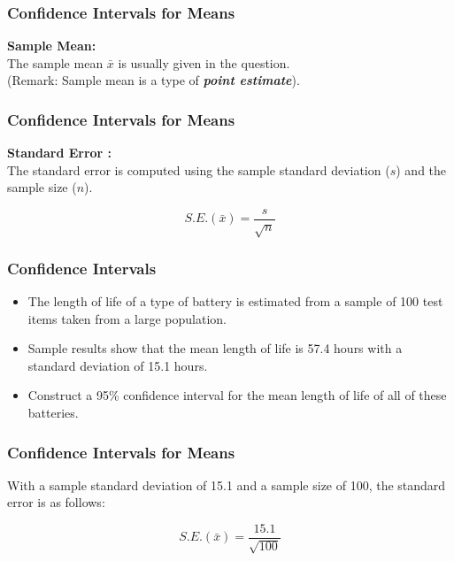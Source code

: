\documentclass{beamer}
\begin{document}
\begin{frame}

\frametitle{Confidence Intervals for Means}
\LARGE
\textbf{Sample Mean:}\\
The sample mean $\bar{x}$ is usually given in the question.
\\ \bigskip
(Remark: Sample mean is a type of \textbf{\textit{point estimate}}).


\end{frame}
\begin{frame}
\frametitle{Confidence Intervals for Means}
\LARGE
\textbf{Standard Error :}\\
The standard error is computed using the sample standard deviation ($s$) and the sample size ($n$).

\[ S.E. (\bar{x}) = \frac{s}{\sqrt{n}} \]



\end{frame}
\begin{frame}
\frametitle{Confidence Intervals}
\Large
\vspace{-1cm}
\begin{itemize}
\item The length of life of a type of battery is estimated from a sample of 100 test items taken from a large population. 
\item Sample results show that the mean length of life is 57.4 hours with a standard deviation of 15.1 hours. \\ \bigskip
\item  Construct a 
95\% confidence interval for the mean length of life of all of these batteries.
\end{itemize}




\end{frame}

\begin{frame}
\frametitle{Confidence Intervals for Means}
\LARGE
\vspace{-2cm}

 With a sample standard deviation of 15.1 and a sample size of 100, the standard error is as follows:
 
 
 \[ S.E. (\bar{x}) = \frac{15.1}{\sqrt{100}} \]




\end{frame}
\end{document}
